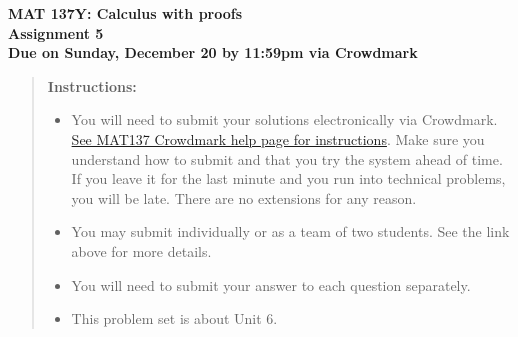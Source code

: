 \documentclass[12pt]{exam}
\newcommand{\vv}{\vspace{.1cm}}
\begin{document}
{\large
	\begin{center}
		{\bf MAT 137Y: Calculus with proofs}\\
		{\bf Assignment 5} \\
		{\bf Due on Sunday, December 20 by 11:59pm via Crowdmark}
	\end{center}
}

\vv

\begin{quotation}
{\bf Instructions:}
	\begin{itemize}
		\item	 You will need to submit your solutions electronically via Crowdmark.   \href{https://www.math.toronto.edu/~alfonso/137/PS/137_CM.html}{See MAT137 Crowdmark help page for instructions}.  Make sure you understand how to submit and that you try the system ahead of time.  If you leave it for the last minute and you run into technical problems, you will be late.  There are no extensions for any reason.
		\item You may submit individually or as a team of two students.  See the link above for more details.
		\item  You will need to submit your answer to each question separately.
		\item  This problem set is about Unit 6.
	\end{itemize}
\end{quotation}
\vv
\end{document}
